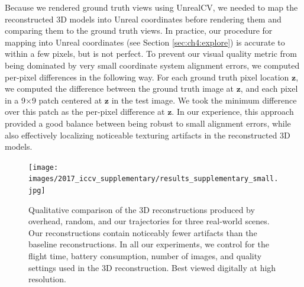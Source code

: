 Because we rendered ground truth views using UnrealCV, we needed to map the reconstructed 3D models into Unreal coordinates before rendering them and comparing them to the ground truth views.
In practice, our procedure for mapping into Unreal coordinates (see Section \ref{sec:ch4:explore}) is accurate to within a few pixels, but is not perfect.
To prevent our visual quality metric from being dominated by very small coordinate system alignment errors, we computed per-pixel differences in the following way.
For each ground truth pixel location $\mathbf{z}$, we computed the difference between the ground truth image at $\mathbf{z}$, and each pixel in a 9$\times$9 patch centered at $\mathbf{z}$ in the test image.
We took the minimum difference over this patch as the per-pixel difference at $\mathbf{z}$.
In our experience, this approach provided a good balance between being robust to small alignment errors, while also effectively localizing noticeable texturing artifacts in the reconstructed 3D models.

\begin{figure}[t]
\begin{center}
\texttt{[image: images/2017\_iccv\_supplementary/results\_supplementary\_small.jpg]}
\end{center}
\caption{
Qualitative comparison of the 3D reconstructions produced by overhead, random, and our trajectories for three real-world scenes.
Our reconstructions contain noticeably fewer artifacts than the baseline reconstructions.
In all our experiments, we control for the flight time, battery consumption, number of images, and quality settings used in the 3D reconstruction.
Best viewed digitally at high resolution.
}
\label{fig:ch4:results_supplementary}
\end{figure}

